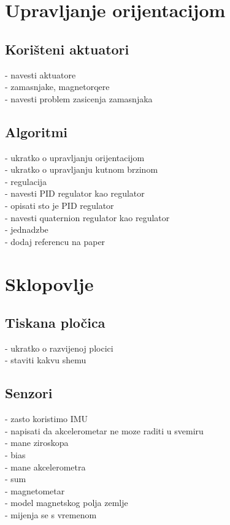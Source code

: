 \documentclass[times, utf8, diplomski, numeric]{templates/template}
\begin{document}
{    \section{Upravljanje orijentacijom}{
        \subsection{Korišteni aktuatori}{
            - navesti aktuatore\\
            - zamasnjake, magnetorqere\\
            - navesti problem zasicenja zamasnjaka\\
        }

        \subsection{Algoritmi}{
            - ukratko o upravljanju orijentacijom\\
            - ukratko o upravljanju kutnom brzinom\\
            - regulacija\\
                - navesti PID regulator kao regulator\\
                - opisati sto je PID regulator\\
                - navesti quaternion regulator kao regulator\\
                    - jednadzbe\\
                    - dodaj referencu na paper\\
        }
    }

    \section{Sklopovlje}{
        \subsection{Tiskana pločica}{
            - ukratko o razvijenoj plocici\\
            - staviti kakvu shemu\\
        }

        \subsection{Senzori}{
            - zasto koristimo IMU\\
            - napisati da akcelerometar ne moze raditi u svemiru\\
            - mane ziroskopa\\
                - bias\\
            - mane akcelerometra\\
                - sum\\
            - magnetometar\\
                - model magnetskog polja zemlje\\
                    - mijenja se s vremenom\\
        }

}}
\end{document}
